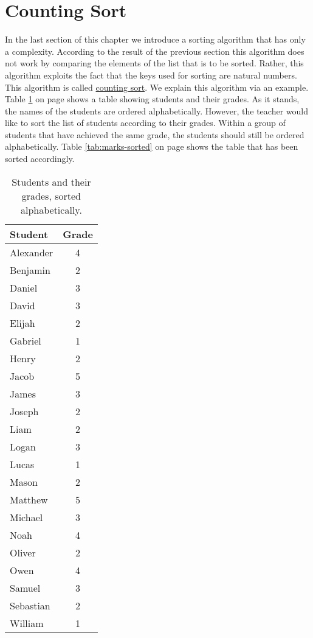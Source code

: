 \section{Counting Sort}
In the last section of this chapter we introduce a sorting algorithm that has only a  complexity.
According to the result of the previous section this algorithm does not work by comparing the elements of the
list that is to be sorted.  Rather, this algorithm exploits the fact that the keys used for sorting are natural
numbers.  This algorithm is called \href{https://en.wikipedia.org/wiki/Counting_sort}{counting sort}. We
explain this algorithm via an example.  Table \ref{tab:marks} on page \pageref{tab:marks} shows a table showing
students and their grades.  As it stands, the names of the students are ordered alphabetically.  However, the
teacher would like to sort the list of students according to their grades.  Within a group of students that
have achieved the same grade, the students should still be ordered alphabetically.  Table
\ref{tab:marks-sorted} on page \pageref{tab:marks-sorted} shows the table that has been sorted accordingly.

\begin{table}[!ht]
  \centering
  \begin{tabular}{|l|c|}
    \hline
    Student   & Grade \\
    \hline
    \hline
    Alexander & 4 \\
    \hline
    Benjamin  & 2 \\
    \hline
    Daniel    & 3 \\
    \hline
    David     & 3 \\
    \hline
    Elijah    & 2 \\
    \hline
    Gabriel   & 1 \\
    \hline
    Henry     & 2 \\
    \hline
    Jacob     & 5 \\
    \hline
    James     & 3 \\
    \hline
    Joseph    & 2 \\
    \hline
    Liam      & 2 \\
    \hline
    Logan     & 3 \\
    \hline
    Lucas     & 1 \\
    \hline
    Mason     & 2 \\
    \hline
    Matthew   & 5 \\
    \hline
    Michael   & 3 \\
    \hline
    Noah      & 4 \\
    \hline
    Oliver    & 2 \\
    \hline
    Owen      & 4 \\
    \hline
    Samuel    & 3 \\
    \hline
    Sebastian & 2 \\
    \hline
    William   & 1 \\
    \hline
  \end{tabular}
  \caption{Students and their grades, sorted alphabetically.}
  \label{tab:marks}
\end{table}


